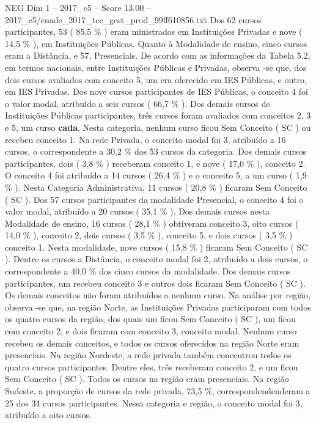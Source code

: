 \begin{textsample}{NEG Dim 1 – 2017\_c5 – Score 13.00 – 2017\_c5/enade\_2017\_tec\_gest\_prod\_99ff610856.txt}
Dos 62 cursos participantes, 53 ( 85,5 \% ) eram ministrados em Instituições Privadas e nove ( 14,5 \% ), em Instituições Públicas.
Quanto à Modalidade de ensino, cinco cursos eram a Distância, e 57, Presenciais.
De acordo com as informações da Tabela 5.2, em termos nacionais, entre Instituições Públicas e Privadas, observa -se que, dos dois cursos avaliados com conceito 5, um era oferecido em IES Públicas, e outro, em IES Privadas.
Dos nove cursos participantes de IES Públicas, o conceito 4 foi o valor modal, atribuído a seis cursos ( 66,7 \% ).
Dos demais cursos de Instituições Públicas participantes, três cursos foram avaliados com conceitos 2, 3 e 5, um curso \textbf{cada}.
Nesta categoria, nenhum curso ficou Sem Conceito ( SC ) ou recebeu conceito 1.
Na rede Privada, o conceito modal foi 3, atribuído a 16 cursos, o correspondente a 30,2 \% dos 53 cursos da categoria.
Dos demais cursos participantes, dois ( 3,8 \% ) receberam conceito 1, e nove ( 17,0 \% ), conceito 2.
O conceito 4 foi atribuído a 14 cursos ( 26,4 \% ) e o conceito 5, a um curso ( 1,9 \% ).
Nesta Categoria Administrativa, 11 cursos ( 20,8 \% ) ficaram Sem Conceito ( SC ).
Dos 57 cursos participantes da modalidade Presencial, o conceito 4 foi o valor modal, atribuído a 20 cursos ( 35,1 \% ).
Dos demais cursos nesta Modalidade de ensino, 16 cursos ( 28,1 \% ) obtiveram conceito 3, oito cursos ( 14,0 \% ), conceito 2, dois cursos ( 3,5 \% ), conceito 5, e dois cursos ( 3,5 \% ) conceito 1.
Nesta modalidade, nove cursos ( 15,8 \% ) ficaram Sem Conceito ( SC ).
Dentre os cursos a Distância, o conceito modal foi 2, atribuído a dois cursos, o correspondente a 40,0 \% dos cinco cursos da modalidade.
Dos demais cursos participantes, um recebeu conceito 3 e outros dois ficaram Sem Conceito ( SC ).
Os demais conceitos não foram atribuídos a nenhum curso.
Na análise por região, observa -se que, na região Norte, as Instituições Privadas participaram com todos os quatro cursos da região, dos quais um ficou Sem Conceito ( SC ), um ficou com conceito 2, e dois ficaram com conceito 3, conceito modal.
Nenhum curso recebeu os demais conceitos, e todos os cursos oferecidos na região Norte eram presenciais.
Na região Nordeste, a rede privada também concentrou todos os quatro cursos participantes.
Dentre eles, três receberam conceito 2, e um ficou Sem Conceito ( SC ).
Todos os cursos na região eram presenciais.
Na região Sudeste, a proporção de cursos da rede privada, 73,5 \%, correspondendenderam a 25 dos 34 cursos participantes.
Nessa categoria e região, o conceito modal foi 3, atribuído a oito cursos.

\end{textsample}
